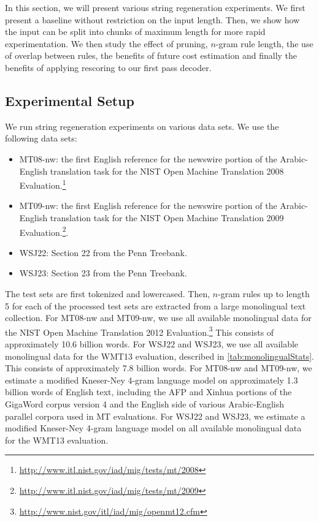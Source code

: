 In this section, we will present various
string regeneration experiments.  We first present
a baseline without restriction on the input length.
Then, we show how
the input can be split into chunks of maximum length for more rapid experimentation. %
We then study the effect of pruning, $n$-gram rule
length, the use of overlap between rules, the benefits of future cost
estimation and finally
the benefits of applying rescoring to our first
pass decoder.

\subsection{Experimental Setup}

We run string regeneration experiments on various
data sets. We use the following data sets:
%
\begin{itemize}
  \item MT08-nw: the first English reference for the newswire portion of the
    Arabic-English translation task for the NIST Open Machine Translation 2008
    Evaluation.\footnote{\url{http://www.itl.nist.gov/iad/mig/tests/mt/2008}}
  \item MT09-nw: the first English reference for the newswire portion of the
    Arabic-English translation task for the NIST Open Machine Translation 2009
    Evaluation.\footnote{\url{http://www.itl.nist.gov/iad/mig/tests/mt/2009}}.
  \item WSJ22: Section 22 from the Penn Treebank.
  \item WSJ23: Section 23 from the Penn Treebank.
\end{itemize}
%
The test sets are first tokenized and lowercased.
Then, $n$-gram rules up to length 5 for each of the processed test sets
are extracted from a large monolingual text collection.
For MT08-nw and MT09-nw, we use all available monolingual data
for the NIST Open Machine Translation 2012
Evaluation.\footnote{\url{http://www.nist.gov/itl/iad/mig/openmt12.cfm}}
This consists of approximately 10.6 billion words.
For WSJ22 and WSJ23, we use all available monolingual data for the WMT13
evaluation, described in \autoref{tab:monolingualStats}.
This consists of approximately 7.8 billion words.
For MT08-nw and MT09-nw, we estimate a modified Kneser-Ney 4-gram language model
on approximately 1.3 billion words of English text, including
the AFP and Xinhua portions of the GigaWord corpus
version 4 and the English side of various Arabic-English
parallel corpora used in MT evaluations. For WSJ22 and WSJ23, we
estimate a modified Kneser-Ney 4-gram language model on all available
monolingual data for the WMT13 evaluation.

